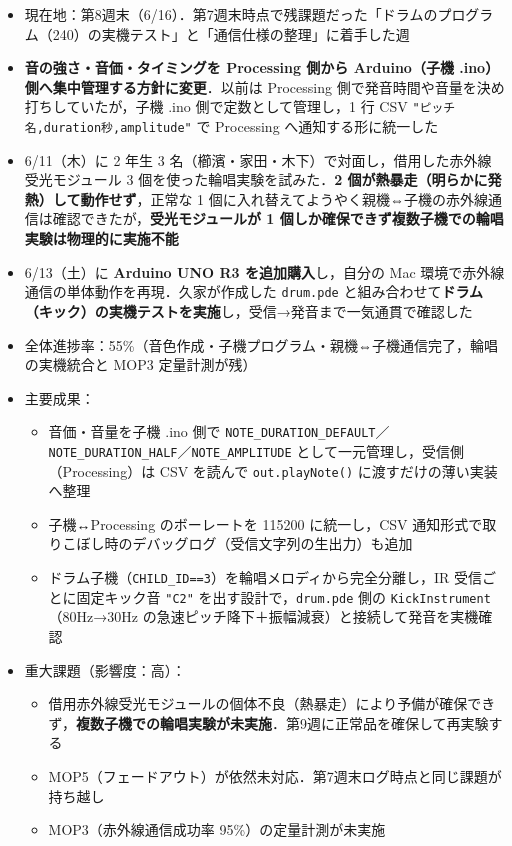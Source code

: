 \documentclass[a4paper,11pt]{ltjsarticle}
\providecommand{\％}{\%}
\begin{document}
\begin{itemize}
    \item 現在地：第8週末（6/16）．第7週末時点で残課題だった「ドラムのプログラム（240）の実機テスト」と「通信仕様の整理」に着手した週
    \item \textbf{音の強さ・音価・タイミングを Processing 側から Arduino（子機 .ino）側へ集中管理する方針に変更}．以前は Processing 側で発音時間や音量を決め打ちしていたが，子機 .ino 側で定数として管理し，1 行 CSV \texttt{"ピッチ名,duration秒,amplitude"} で Processing へ通知する形に統一した
    \item 6/11（木）に 2 年生 3 名（櫛濱・家田・木下）で対面し，借用した赤外線受光モジュール 3 個を使った輪唱実験を試みた．\textbf{2 個が熱暴走（明らかに発熱）して動作せず}，正常な 1 個に入れ替えてようやく親機⇔子機の赤外線通信は確認できたが，\textbf{受光モジュールが 1 個しか確保できず複数子機での輪唱実験は物理的に実施不能}
    \item 6/13（土）に \textbf{Arduino UNO R3 を追加購入}し，自分の Mac 環境で赤外線通信の単体動作を再現．久家が作成した \texttt{drum.pde} と組み合わせて\textbf{ドラム（キック）の実機テストを実施}し，受信→発音まで一気通貫で確認した
    \item 全体進捗率：55\％（音色作成・子機プログラム・親機⇔子機通信完了，輪唱の実機統合と MOP3 定量計測が残）
    \item 主要成果：
    \begin{itemize}
        \item 音価・音量を子機 .ino 側で \texttt{NOTE\_DURATION\_DEFAULT}／\texttt{NOTE\_DURATION\_HALF}／\texttt{NOTE\_AMPLITUDE} として一元管理し，受信側（Processing）は CSV を読んで \texttt{out.playNote()} に渡すだけの薄い実装へ整理
        \item 子機↔Processing のボーレートを 115200 に統一し，CSV 通知形式で取りこぼし時のデバッグログ（受信文字列の生出力）も追加
        \item ドラム子機（\texttt{CHILD\_ID==3}）を輪唱メロディから完全分離し，IR 受信ごとに固定キック音 \texttt{"C2"} を出す設計で，\texttt{drum.pde} 側の \texttt{KickInstrument}（80Hz→30Hz の急速ピッチ降下＋振幅減衰）と接続して発音を実機確認
    \end{itemize}
    \item 重大課題（影響度：高）：
    \begin{itemize}
        \item 借用赤外線受光モジュールの個体不良（熱暴走）により予備が確保できず，\textbf{複数子機での輪唱実験が未実施}．第9週に正常品を確保して再実験する
        \item MOP5（フェードアウト）が依然未対応．第7週末ログ時点と同じ課題が持ち越し
        \item MOP3（赤外線通信成功率 95\％）の定量計測が未実施
    \end{itemize}
\end{itemize}
\end{document}
